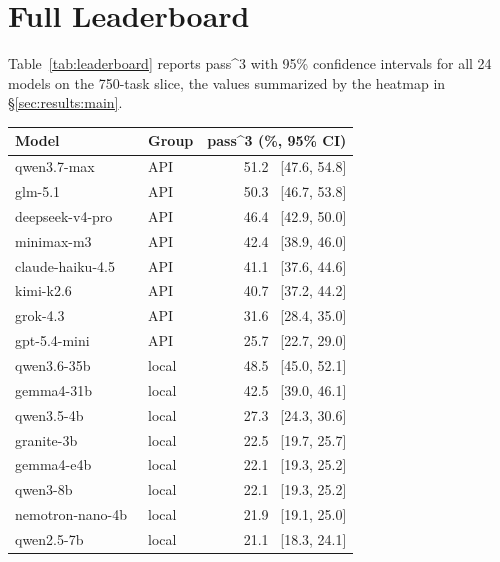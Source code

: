 \appendix

\section{Full Leaderboard}
\label{app:leaderboard}
Table~\ref{tab:leaderboard} reports pass\textasciicircum{}3 with 95\% confidence
intervals for all 24 models on the 750-task slice, the values summarized by
the heatmap in \S\ref{sec:results:main}.

\begin{table}[t]
  \centering
  \small
  \begin{tabular}{llr}
    \toprule
    Model & Group & pass\textasciicircum{}3 (\%, 95\% CI) \\
    \midrule
    qwen3.7-max~\cite{qwen37} & API & 51.2 \, [47.6, 54.8] \\
    glm-5.1~\cite{glm5team2026glm5vibecodingagentic} & API & 50.3 \, [46.7, 53.8] \\
    deepseek-v4-pro~\cite{deepseekai2026deepseekv4} & API & 46.4 \, [42.9, 50.0] \\
    minimax-m3~\cite{lai2026minimaxsparseattention} & API & 42.4 \, [38.9, 46.0] \\
    claude-haiku-4.5~\cite{ClaudeHaiku4.5} & API & 41.1 \, [37.6, 44.6] \\
    kimi-k2.6~\cite{kimiteam2026kimik2openagentic} & API & 40.7 \, [37.2, 44.2] \\
    grok-4.3~\cite{grok43_xai} & API & 31.6 \, [28.4, 35.0] \\
    gpt-5.4-mini~\cite{singh2026openaigpt5card} & API & 25.7 \, [22.7, 29.0] \\
    \midrule
    qwen3.6-35b~\cite{qwen36_35b_a3b} & local & 48.5 \, [45.0, 52.1] \\
    gemma4-31b~\cite{gemma4google} & local & 42.5 \, [39.0, 46.1] \\
    qwen3.5-4b~\cite{qwen3.5} & local & 27.3 \, [24.3, 30.6] \\
    granite-3b~\cite{stallone2024scalinggranitecodemodels} & local & 22.5 \, [19.7, 25.7] \\
    gemma4-e4b~\cite{gemma4google} & local & 22.1 \, [19.3, 25.2] \\
    qwen3-8b~\cite{qwen3technicalreport} & local & 22.1 \, [19.3, 25.2] \\
    nemotron-nano-4b~\cite{parmar2024nemotron415btechnicalreport} & local & 21.9 \, [19.1, 25.0] \\
    qwen2.5-7b~\cite{qwen2025qwen25technicalreport} & local & 21.1 \, [18.3, 24.1] \\

\end{tabular}
\end{table}
